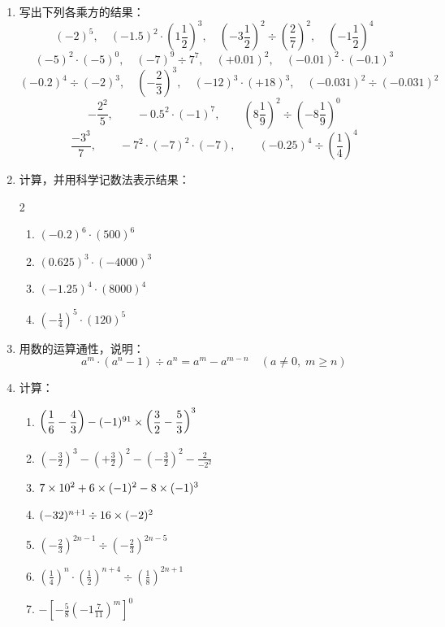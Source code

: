 \begin{enumerate}
	\item 写出下列各乘方的结果：
	\[(-2)^{5},\quad (-1.5)^{2} \cdot\left(1 \frac{1}{2}\right)^{3},\quad  \left(-3 \frac{1}{2}\right)^{2} \div\left(\frac{2}{7}\right)^{2} ,\quad \left(-1 \frac{1}{2}\right)^{4}\]
	\[(-5)^{2} \cdot(-5)^{0} ,\quad(-7)^{9}\div 7^{7} ,\quad (+0.01)^2,\quad (-0.01)^2\cdot (-0.1)^3\]
	\[(-0.2)^4\div (-2)^3,\quad \left(-\frac{2}{3}\right)^3,\quad (-12)^3\cdot (+18)^3,\quad (-0.031)^2\div (-0.031)^2\]
	\[-\frac{2^2}{5},\qquad -0.5^2\cdot (-1)^7,\qquad \left(8\frac{1}{9}\right)^2\div \left(-8\frac{1}{9}\right)^0\]
	\[\frac{-3^3}{7},\qquad -7^2\cdot (-7)^2\cdot (-7),\qquad (-0.25)^4\div \left(\frac{1}{4}\right)^4\]
	
	\item  计算，并用科学记数法表示结果：
	\begin{multicols}{2}
		\begin{enumerate}
			\item $(-0.2)^6\cdot (500)^6$
			\item $(0.625)^3\cdot (-4000)^3$
			\item $(-1.25)^4\cdot (8000)^4$
			\item $\left(-\frac{1}{4}\right)^5\cdot (120)^5$
		\end{enumerate}
	\end{multicols}
	
	\item 用数的运算通性，说明：
	\[a^m\cdot (a^n-1)\div a^n=a^m-a^{m-n}\quad (a\ne 0,\; m\ge n)\]
	
	\item 计算：
	\begin{enumerate}
		\item $\left(\dfrac{1}{6}-\dfrac{4}{3}\right)-(-1)^{91}\times \left(\dfrac{3}{2}-\dfrac{5}{3}\right)^3$
		\item $\left(-\frac{3}{2}\right)^3-\left(+\frac{3}{2}\right)^2-\left(-\frac{3}{2}\right)^2-\frac{2}{-2^2}$
		\item $7\times 10^2+6\times (-1)^2-8\times (-1)^3$
		\item $(-32)^{n+1}\div 16\times (-2)^2$
		\item $\left(-\frac{2}{3}\right)^{2n-1}\div \left(-\frac{2}{3}\right)^{2n-5}$
		\item $\left(\frac{1}{4}\right)^{n}\cdot \left(\frac{1}{2}\right)^{n+4}\div \left(\frac{1}{8}\right)^{2n+1}$
		\item $-\left[-\frac{5}{8}\left(-1\frac{7}{11}\right)^m\right]^0$
	\end{enumerate}
	

\end{enumerate}
